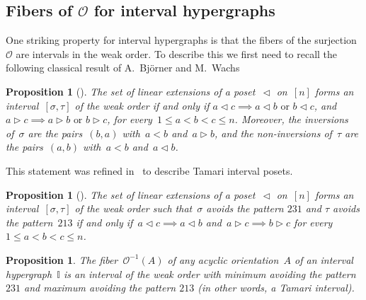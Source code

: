 \documentclass{amsart}
\newtheorem{proposition}[theorem]{Proposition}
\theoremstyle{definition}
\newcommand{\less}{\vartriangleleft} %
\newcommand{\more}{\vartriangleright} %
\newcommand{\Or}{\mathcal O}  %
\newcommand{\II}{\mathbb I} %
\begin{document}

\subsection{Fibers of $\Or$ for interval hypergraphs} 
\label{subsec:preimageI}

One striking property for interval hypergraphs is that the fibers of the surjection~$\Or$ are intervals in the weak order.
To describe this we first need to recall the following classical result of A.~Bj\"orner and M.~Wachs~\cite[Thm.~6.8]{BjornerWachs}

\begin{proposition}[{\cite[Thm.~6.8]{BjornerWachs}}]
\label{prop:WOIP}
The set of linear extensions of a poset~$\less$ on~$[n]$ forms an interval~$[\sigma, \tau]$ of the weak order if and only if ${a \less c \implies a \less b \text{ or } b \less c}$, and~${a \more c \implies a \more b \text{ or } b \more c}$, for every~$1 \le a < b < c \le n$.
Moreover, the inversions of~$\sigma$ are the pairs~$(b,a)$ with~$a < b$ and~$a \more b$, and the non-inversions of~$\tau$ are the pairs~$(a,b)$ with~$a < b$ and~$a \less b$.
\end{proposition}

This statement was refined in~\cite{ChatelPilaudPons} to describe Tamari interval posets.

\begin{proposition}[{\cite[Coro.~2.24]{ChatelPilaudPons}}]
\label{prop:TOIP}
The set of linear extensions of a poset~$\less$ on~$[n]$ forms an interval~$[\sigma, \tau]$ of the weak order such that~$\sigma$ avoids the pattern $231$ and $\tau$ avoids the pattern~$213$ if and only if~${a \less c \implies a \less b}$ and~$a \more c \implies b \more c$ for every~$1 \le a < b < c \le n$.
\end{proposition}

\begin{proposition}
\label{prop:preimageI}
The fiber~$\Or^{-1}(A)$ of any acyclic orientation~$A$ of an interval hypergraph~$\II$ is an interval of the weak order with minimum avoiding the pattern $231$ and maximum avoiding the pattern $213$ (in other words, a Tamari interval).
\end{proposition}
\end{document}
